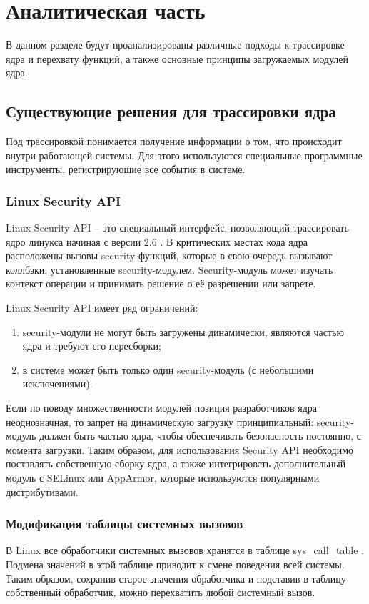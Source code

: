 \chapter{Аналитическая часть}
	В данном разделе будут проанализированы различные подходы к трассировке ядра 
	и перехвату функций, а также основные принципы загружаемых модулей ядра.

\section{Существующие решения для трассировки ядра}
	Под трассировкой понимается получение информации о том, 
	что происходит внутри работающей системы. 
	Для этого используются специальные программные инструменты,
	регистрирующие все события в системе. 

	\subsection{Linux Security API}
		Linux Security API -- это специальный интерфейс, позволяющий трассировать ядро линукса начиная с версии 2.6 \cite{lsm}.
		В критических местах кода ядра расположены вызовы security-функций, которые в свою очередь вызывают коллбэки,
		установленные security-модулем.
		Security-модуль может изучать контекст операции и принимать решение о её разрешении или запрете.

		Linux Security API имеет ряд ограничений:
		\begin{enumerate}
			\item security-модули не могут быть загружены динамически, являются частью ядра и требуют его пересборки;
			\item в системе может быть только один security-модуль (с небольшими исключениями).
		\end{enumerate}

		Если по поводу множественности модулей позиция разработчиков ядра неоднозначная, 
		то запрет на динамическую загрузку принципиальный: security-модуль должен быть частью ядра,
		чтобы обеспечивать безопасность постоянно, с момента загрузки. 
		Таким образом, для использования Security API необходимо поставлять собственную сборку ядра,
		а также интегрировать дополнительный модуль с SELinux или AppArmor, 
		которые используются популярными дистрибутивами.

	\subsection{Модификация таблицы системных вызовов}
		В Linux все обработчики системных вызовов хранятся в таблице sys\_call\_table \cite{linux-syscall-reference}.
		Подмена значений в этой таблице приводит к смене поведения всей системы. 
		Таким образом, сохранив старое значения обработчика и подставив в таблицу собственный обработчик, 
		можно перехватить любой системный вызов.

